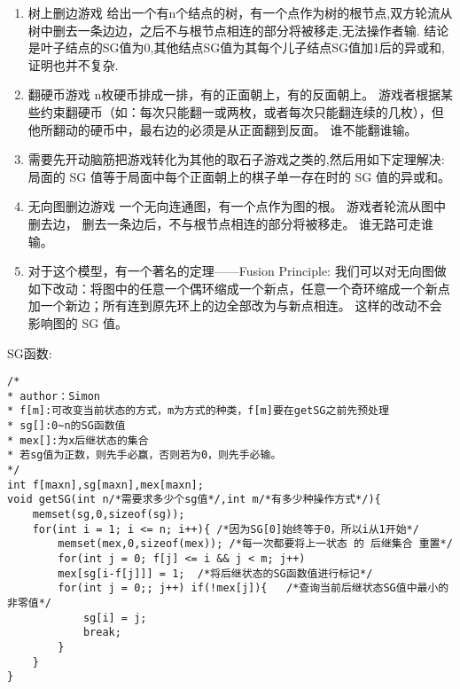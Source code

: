 \begin{enumerate}
	\item 树上删边游戏
	给出一个有n个结点的树，有一个点作为树的根节点,双方轮流从树中删去一条边边，之后不与根节点相连的部分将被移走,无法操作者输.
	结论是叶子结点的SG值为0,其他结点SG值为其每个儿子结点SG值加1后的异或和,证明也并不复杂.
	
	\item 翻硬币游戏
	n枚硬币排成一排，有的正面朝上，有的反面朝上。
	游戏者根据某些约束翻硬币（如：每次只能翻一或两枚，或者每次只能翻连续的几枚），但他所翻动的硬币中，最右边的必须是从正面翻到反面。
	谁不能翻谁输。
	
	\item 需要先开动脑筋把游戏转化为其他的取石子游戏之类的,然后用如下定理解决:
	局面的 SG 值等于局面中每个正面朝上的棋子单一存在时的 SG 值的异或和。
	
	\item 无向图删边游戏
	一个无向连通图，有一个点作为图的根。
	游戏者轮流从图中删去边， 删去一条边后，不与根节点相连的部分将被移走。
	谁无路可走谁输。
	
	\item 对于这个模型，有一个著名的定理——Fusion Principle:
	我们可以对无向图做如下改动：将图中的任意一个偶环缩成一个新点，任意一个奇环缩成一个新点加一个新边；所有连到原先环上的边全部改为与新点相连。 这样的改动不会影响图的 SG 值。
\end{enumerate}

SG函数:
\begin{lstlisting}
/* 
* author：Simon
* f[m]:可改变当前状态的方式，m为方式的种类，f[m]要在getSG之前先预处理
* sg[]:0~n的SG函数值
* mex[]:为x后继状态的集合
* 若sg值为正数，则先手必赢，否则若为0，则先手必输。
*/
int f[maxn],sg[maxn],mex[maxn];
void getSG(int n/*需要求多少个sg值*/,int m/*有多少种操作方式*/){
	memset(sg,0,sizeof(sg));
	for(int i = 1; i <= n; i++){ /*因为SG[0]始终等于0，所以i从1开始*/
		memset(mex,0,sizeof(mex)); /*每一次都要将上一状态 的 后继集合 重置*/
		for(int j = 0; f[j] <= i && j < m; j++)
		mex[sg[i-f[j]]] = 1;  /*将后继状态的SG函数值进行标记*/
		for(int j = 0;; j++) if(!mex[j]){   /*查询当前后继状态SG值中最小的非零值*/
			sg[i] = j;
			break;
		}
	}
}
\end{lstlisting}